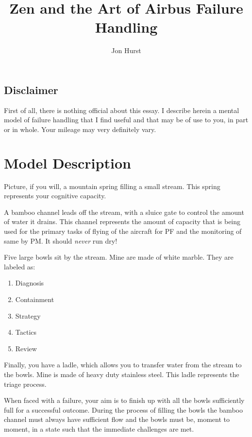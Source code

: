 \documentclass[a5paper,11pt,titlepage]{article}
\title{Zen and the Art of Airbus Failure Handling}
\author{Jon Hurst}
\begin{document}
\maketitle

\begin{tcolorbox}[colframe=red]
\section*{Disclaimer}

First of all, there is nothing official about this essay. I describe
herein a mental model of failure handling that I find useful and that
may be of use to you, in part or in whole. Your mileage may very
definitely vary.

\end{tcolorbox}

\section{Model Description}

Picture, if you will, a mountain spring filling a small stream. This
spring represents your cognitive capacity.

A bamboo channel leads off the stream, with a sluice gate to control the
amount of water it drains. This channel represents the amount of
capacity that is being used for the primary tasks of flying of the
aircraft for PF and the monitoring of same by PM. It should \emph{never}
run dry!

Five large bowls sit by the stream. Mine are made of white marble. They
are labeled as:

\begin{enumerate}
\item Diagnosis
\item Containment
\item Strategy
\item Tactics
\item Review
\end{enumerate}

Finally, you have a ladle, which allows you to transfer water from the
stream to the bowls. Mine is made of heavy duty stainless steel. This
ladle represents the triage process.

When faced with a failure, your aim is to finish up with all the bowls
sufficiently full for a successful outcome. During the process of
filling the bowls the bamboo channel must always have sufficient
flow and the bowls must be, moment to moment, in a state such that the
immediate challenges are met.
\end{document}
